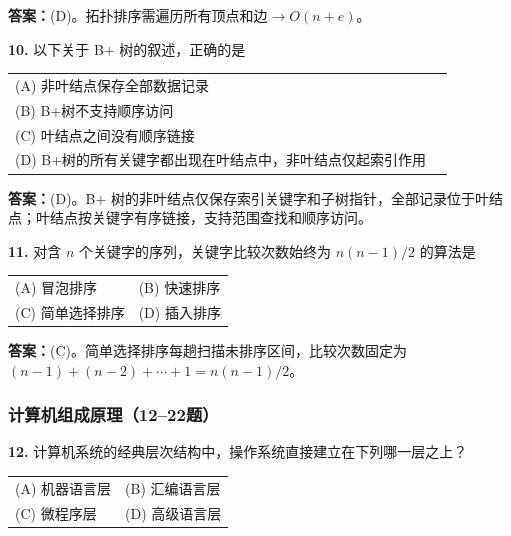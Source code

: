 \ifshowsolutions\par\noindent\textbf{答案：}(D)。拓扑排序需遍历所有顶点和边$\to O(n+e)$。\else \answerarea \fi

\vspace{6pt}

\noindent\textbf{10.} 以下关于 B+ 树的叙述，正确的是
\begin{center}
\begin{tabular}{ll}
(A) 非叶结点保存全部数据记录 \\[4pt]
(B) B+树不支持顺序访问 \\[4pt]
(C) 叶结点之间没有顺序链接 \\[4pt]
(D) B+树的所有关键字都出现在叶结点中，非叶结点仅起索引作用
\end{tabular}
\end{center}

\ifshowsolutions\par\noindent\textbf{答案：}(D)。B+ 树的非叶结点仅保存索引关键字和子树指针，全部记录位于叶结点；叶结点按关键字有序链接，支持范围查找和顺序访问。\else \answerarea \fi

\vspace{6pt}

\noindent\textbf{11.} 对含 $n$ 个关键字的序列，关键字比较次数始终为 $n(n-1)/2$ 的算法是
\begin{center}
\begin{tabular}{ll}
(A) 冒泡排序 & (B) 快速排序 \\[6pt]
(C) 简单选择排序 & (D) 插入排序
\end{tabular}
\end{center}

\ifshowsolutions\par\noindent\textbf{答案：}(C)。简单选择排序每趟扫描未排序区间，比较次数固定为 $(n-1)+(n-2)+\cdots+1=n(n-1)/2$。\else \answerarea \fi

\subsubsection*{计算机组成原理（12--22题）}

\noindent\textbf{12.} 计算机系统的经典层次结构中，操作系统直接建立在下列哪一层之上？
\begin{center}
\begin{tabular}{ll}
(A) 机器语言层 & (B) 汇编语言层 \\[6pt]
(C) 微程序层 & (D) 高级语言层
\end{tabular}
\end{center}

